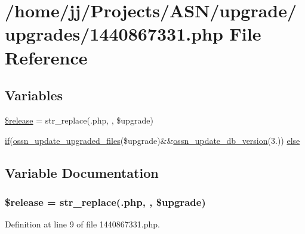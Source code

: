 \hypertarget{1440867331_8php}{}\section{/home/jj/\+Projects/\+A\+S\+N/upgrade/upgrades/1440867331.php File Reference}
\label{1440867331_8php}
\subsection*{Variables}
\begin{DoxyCompactItemize}
\item 
\hyperlink{1440867331_8php_a63c5d6a8a9f1768ea926cee666dc991b}{\$release} = str\+\_\+replace(\textquotesingle{}.php\textquotesingle{}, \textquotesingle{}\textquotesingle{}, \$upgrade)
\item 
\hyperlink{jquery_8tokeninput_8js_ad8dd46a3cbc004569e34401e9e71771a}{if}(\hyperlink{ossn_8lib_8upgrade_8php_af5e235e44fa65a589d768b2693399250}{ossn\+\_\+update\+\_\+upgraded\+\_\+files}(\$upgrade)\&\&\hyperlink{ossn_8lib_8upgrade_8php_aa7120e10a9c14b722b0e25c99bc86d92}{ossn\+\_\+update\+\_\+db\+\_\+version}(\textquotesingle{}3.\textquotesingle{})) \hyperlink{1440867331_8php_abe4528ca4e58f789af9016aac9405821}{else}
\end{DoxyCompactItemize}


\subsection{Variable Documentation}
\subsubsection[{\texorpdfstring{\$release}{$release}}]{\setlength{\rightskip}{0pt plus 5cm}\$release = str\+\_\+replace(\textquotesingle{}.php\textquotesingle{}, \textquotesingle{}\textquotesingle{}, \$upgrade)}\hypertarget{1440867331_8php_a63c5d6a8a9f1768ea926cee666dc991b}{}\label{1440867331_8php_a63c5d6a8a9f1768ea926cee666dc991b}


Definition at line 9 of file 1440867331.\+php.

